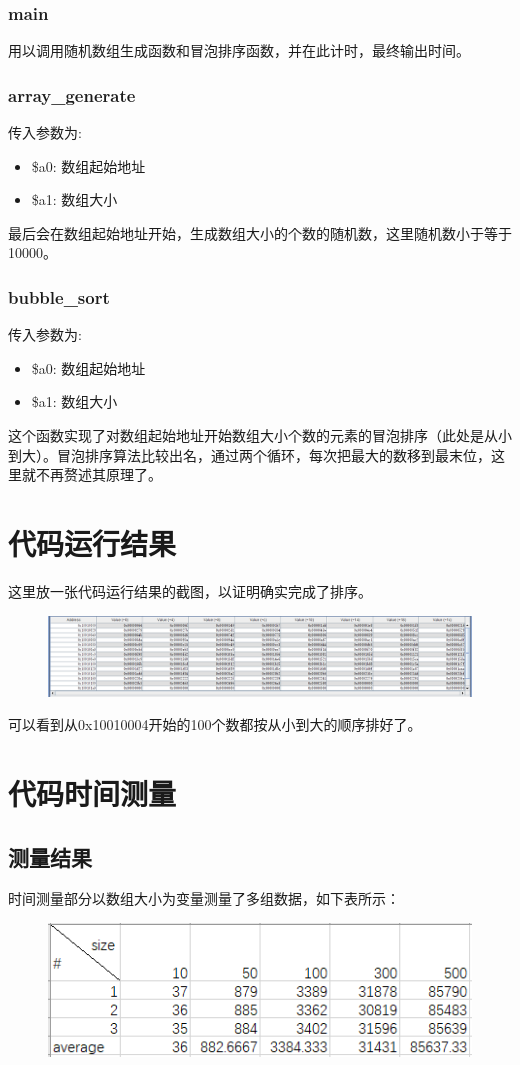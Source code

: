 \documentclass[UTF8]{article}
\begin{document}
\subsubsection{main}
用以调用随机数组生成函数和冒泡排序函数，并在此计时，最终输出时间。
\subsubsection{array\_generate}
传入参数为: 
\begin{itemize}
	\item \$a0: 数组起始地址
	\item \$a1: 数组大小
\end{itemize}
最后会在数组起始地址开始，生成数组大小的个数的随机数，这里随机数小于等于10000。
\subsubsection{bubble\_sort}
传入参数为: 
\begin{itemize}
	\item \$a0: 数组起始地址
	\item \$a1: 数组大小
\end{itemize}
这个函数实现了对数组起始地址开始数组大小个数的元素的冒泡排序（此处是从小到大）。冒泡排序算法比较出名，通过两个循环，每次把最大的数移到最末位，这里就不再赘述其原理了。

\section{代码运行结果}
这里放一张代码运行结果的截图，以证明确实完成了排序。
\begin{figure}[H]
	\centering
	\includegraphics[scale=0.36]{sort_100.png}
\end{figure}\par
可以看到从0x10010004开始的100个数都按从小到大的顺序排好了。


\section{代码时间测量}
\subsection{测量结果}
时间测量部分以数组大小为变量测量了多组数据，如下表所示：
\begin{figure}[H]
	\centering
	\includegraphics[scale=0.8]{test_result.png}
\end{figure}\par
\end{document}
